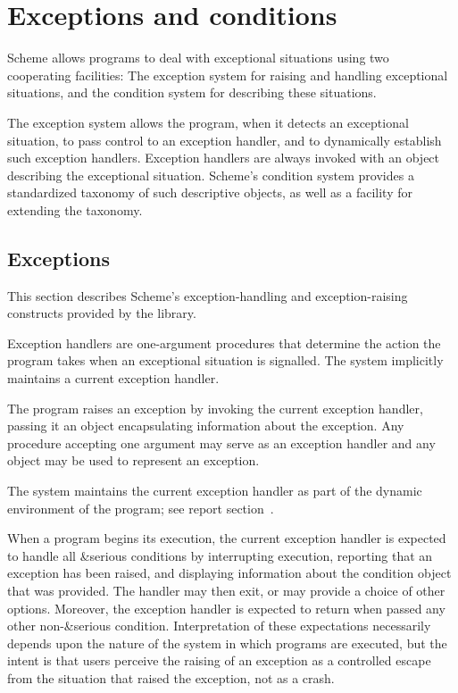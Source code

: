 \chapter{Exceptions and conditions}
\label{exceptionsconditionschapter}

Scheme allows programs to deal with exceptional situations using two
cooperating facilities: The exception system for raising and handling
exceptional situations, and the condition system for describing these
situations.

The exception system allows the program, when it detects an
exceptional situation, to pass control to an exception handler, and
to dynamically establish such exception handlers.  Exception
handlers are always invoked with an object describing the exceptional
situation.  Scheme's condition system provides a standardized taxonomy
of such descriptive objects, as well as a facility for extending the
taxonomy.

\section{Exceptions}
\label{exceptionssection}

This section describes Scheme's exception-handling and
exception-raising constructs provided by the  library.

Exception handlers are one-argument procedures that determine the
action the program takes when an exceptional situation is signalled.
The system implicitly maintains a current exception handler.

The program raises an exception
by invoking the current exception handler, passing it an object
encapsulating information about the exception. Any procedure accepting
one argument may serve as an exception handler and any object may be
used to represent an exception.

The system maintains the current exception handler as part of the
dynamic environment of the program; see report
section~.

When a program begins its execution, the current
exception handler is expected to handle all {\cf\&serious}
conditions by interrupting execution, reporting that an
exception has been raised, and displaying information
about the condition object that was provided.  The handler
may then exit, or may provide a choice of other options.
Moreover, the exception handler is expected to return when
passed any other non-{\cf\&serious} condition.
Interpretation of these expectations necessarily depends
upon the nature of the system in which programs are executed,
but the intent is that users perceive the raising of an
exception as a controlled escape from the situation that
raised the exception, not as a crash.

